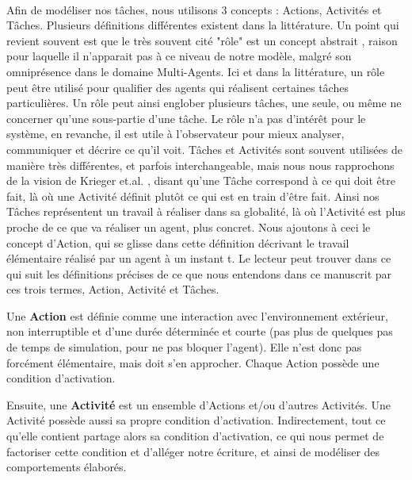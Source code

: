 		\paragraph{}
			Afin de modéliser nos tâches, nous utilisons 3 concepts : Actions, Activités et Tâches. Plusieurs définitions différentes existent dans la littérature. Un point qui revient souvent est que le très souvent cité "rôle" est un concept abstrait \cite{ferber_meta-model_1998, wooldridge_methodology_1999, campbell_multi-agent_2011}, raison pour laquelle il n'apparait pas à ce niveau de notre modèle, malgré son omniprésence dans le domaine Multi-Agents. Ici et dans la littérature, un rôle peut être utilisé pour qualifier des agents qui réalisent certaines tâches particulières. Un rôle peut ainsi englober plusieurs tâches, une seule, ou même ne concerner qu'une sous-partie d'une tâche. Le rôle n'a pas d'intérêt pour le système, en revanche, il est utile à l'observateur pour mieux analyser, communiquer et décrire ce qu'il voit. Tâches et Activités sont souvent utilisées de manière très différentes, et parfois interchangeable, mais nous nous rapprochons de la vision de Krieger et.al. \cite{krieger_call_2000}, disant qu'une Tâche correspond à ce qui doit être fait, là où une Activité définit plutôt ce qui est en train d'être fait. Ainsi nos Tâches représentent un travail à réaliser dans sa globalité, là où l'Activité est plus proche de ce que va réaliser un agent, plus concret. Nous ajoutons à ceci le concept d'Action, qui se glisse dans cette définition décrivant le travail élémentaire réalisé par un agent à un instant t. Le lecteur peut trouver dans ce qui suit les définitions précises de ce que nous entendons dans ce manuscrit par ces trois termes, Action, Activité et Tâches.
			
			Une \textbf{Action} est définie comme une interaction avec l'environnement extérieur, non interruptible et d'une durée déterminée et courte (pas plus de quelques pas de temps de simulation, pour ne pas bloquer l'agent). Elle n'est donc pas forcément élémentaire, mais doit s'en approcher. Chaque Action possède une condition d'activation.
			
			Ensuite, une \textbf{Activité} est un ensemble d'Actions et/ou d'autres Activités. Une Activité possède aussi sa propre condition d'activation. Indirectement, tout ce qu'elle contient partage alors sa condition d'activation, ce qui nous permet de factoriser cette condition et d'alléger notre écriture, et ainsi de modéliser des comportements élaborés.
			
